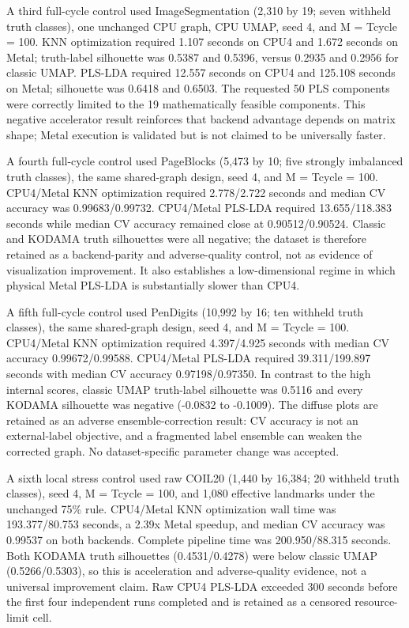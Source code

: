\documentclass[twoside,11pt]{article}
\begin{document}
\begin{small}
A third full-cycle control used ImageSegmentation (2,310 by 19; seven withheld truth classes), one unchanged CPU graph, CPU UMAP, seed 4, and M = Tcycle = 100. KNN optimization required 1.107 seconds on CPU4 and 1.672 seconds on Metal; truth-label silhouette was 0.5387 and 0.5396, versus 0.2935 and 0.2956 for classic UMAP. PLS-LDA required 12.557 seconds on CPU4 and 125.108 seconds on Metal; silhouette was 0.6418 and 0.6503. The requested 50 PLS components were correctly limited to the 19 mathematically feasible components. This negative accelerator result reinforces that backend advantage depends on matrix shape; Metal execution is validated but is not claimed to be universally faster.

A fourth full-cycle control used PageBlocks (5,473 by 10; five strongly imbalanced truth classes), the same shared-graph design, seed 4, and M = Tcycle = 100. CPU4/Metal KNN optimization required 2.778/2.722 seconds and median CV accuracy was 0.99683/0.99732. CPU4/Metal PLS-LDA required 13.655/118.383 seconds while median CV accuracy remained close at 0.90512/0.90524. Classic and KODAMA truth silhouettes were all negative; the dataset is therefore retained as a backend-parity and adverse-quality control, not as evidence of visualization improvement. It also establishes a low-dimensional regime in which physical Metal PLS-LDA is substantially slower than CPU4.

A fifth full-cycle control used PenDigits (10,992 by 16; ten withheld truth classes), the same shared-graph design, seed 4, and M = Tcycle = 100. CPU4/Metal KNN optimization required 4.397/4.925 seconds with median CV accuracy 0.99672/0.99588. CPU4/Metal PLS-LDA required 39.311/199.897 seconds with median CV accuracy 0.97198/0.97350. In contrast to the high internal scores, classic UMAP truth-label silhouette was 0.5116 and every KODAMA silhouette was negative (-0.0832 to -0.1009). The diffuse plots are retained as an adverse ensemble-correction result: CV accuracy is not an external-label objective, and a fragmented label ensemble can weaken the corrected graph. No dataset-specific parameter change was accepted.

A sixth local stress control used raw COIL20 (1,440 by 16,384; 20 withheld truth classes), seed 4, M = Tcycle = 100, and 1,080 effective landmarks under the unchanged 75\% rule. CPU4/Metal KNN optimization wall time was 193.377/80.753 seconds, a 2.39x Metal speedup, and median CV accuracy was 0.99537 on both backends. Complete pipeline time was 200.950/88.315 seconds. Both KODAMA truth silhouettes (0.4531/0.4278) were below classic UMAP (0.5266/0.5303), so this is acceleration and adverse-quality evidence, not a universal improvement claim. Raw CPU4 PLS-LDA exceeded 300 seconds before the first four independent runs completed and is retained as a censored resource-limit cell.


\end{small}
\end{document}
